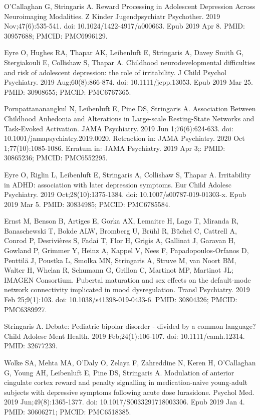\documentclass[
]{article}
\begin{document}
O'Callaghan G, Stringaris A. Reward Processing in Adolescent Depression
Across Neuroimaging Modalities. Z Kinder Jugendpsychiatr Psychother.
2019 Nov;47(6):535-541. doi: 10.1024/1422-4917/a000663. Epub 2019 Apr 8.
PMID: 30957688; PMCID: PMC6996129.

Eyre O, Hughes RA, Thapar AK, Leibenluft E, Stringaris A, Davey Smith G,
Stergiakouli E, Collishaw S, Thapar A. Childhood neurodevelopmental
difficulties and risk of adolescent depression: the role of
irritability. J Child Psychol Psychiatry. 2019 Aug;60(8):866-874. doi:
10.1111/jcpp.13053. Epub 2019 Mar 25. PMID: 30908655; PMCID: PMC6767365.

Pornpattananangkul N, Leibenluft E, Pine DS, Stringaris A. Association
Between Childhood Anhedonia and Alterations in Large-scale Resting-State
Networks and Task-Evoked Activation. JAMA Psychiatry. 2019 Jun
1;76(6):624-633. doi: 10.1001/jamapsychiatry.2019.0020. Retraction in:
JAMA Psychiatry. 2020 Oct 1;77(10):1085-1086. Erratum in: JAMA
Psychiatry. 2019 Apr 3;: PMID: 30865236; PMCID: PMC6552295.

Eyre O, Riglin L, Leibenluft E, Stringaris A, Collishaw S, Thapar A.
Irritability in ADHD: association with later depression symptoms. Eur
Child Adolesc Psychiatry. 2019 Oct;28(10):1375-1384. doi:
10.1007/s00787-019-01303-x. Epub 2019 Mar 5. PMID: 30834985; PMCID:
PMC6785584.

Ernst M, Benson B, Artiges E, Gorka AX, Lemaitre H, Lago T, Miranda R,
Banaschewski T, Bokde ALW, Bromberg U, Brühl R, Büchel C, Cattrell A,
Conrod P, Desrivières S, Fadai T, Flor H, Grigis A, Gallinat J, Garavan
H, Gowland P, Grimmer Y, Heinz A, Kappel V, Nees F, Papadopoulos-Orfanos
D, Penttilä J, Poustka L, Smolka MN, Stringaris A, Struve M, van Noort
BM, Walter H, Whelan R, Schumann G, Grillon C, Martinot MP, Martinot JL;
IMAGEN Consortium. Pubertal maturation and sex effects on the
default-mode network connectivity implicated in mood dysregulation.
Transl Psychiatry. 2019 Feb 25;9(1):103. doi: 10.1038/s41398-019-0433-6.
PMID: 30804326; PMCID: PMC6389927.

Stringaris A. Debate: Pediatric bipolar disorder - divided by a common
language? Child Adolesc Ment Health. 2019 Feb;24(1):106-107. doi:
10.1111/camh.12314. PMID: 32677239.

Wolke SA, Mehta MA, O'Daly O, Zelaya F, Zahreddine N, Keren H,
O'Callaghan G, Young AH, Leibenluft E, Pine DS, Stringaris A. Modulation
of anterior cingulate cortex reward and penalty signalling in
medication-naive young-adult subjects with depressive symptoms following
acute dose lurasidone. Psychol Med. 2019 Jun;49(8):1365-1377. doi:
10.1017/S0033291718003306. Epub 2019 Jan 4. PMID: 30606271; PMCID:
PMC6518385.
\end{document}
